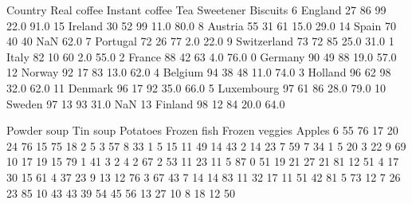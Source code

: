 \documentclass[letterpaper,10pt,english]{jupyterBook}
\begin{document}
\begin{sphinxVerbatim}[commandchars=\\\{\}]
        Country  Real coffee  Instant coffee  Tea  Sweetener  Biscuits  \PYGZbs{}
6       England           27              86   99       22.0      91.0   
15      Ireland           30              52   99       11.0      80.0   
8       Austria           55              31   61       15.0      29.0   
14        Spain           70              40   40        NaN      62.0   
7      Portugal           72              26   77        2.0      22.0   
9   Switzerland           73              72   85       25.0      31.0   
1         Italy           82              10   60        2.0      55.0   
2        France           88              42   63        4.0      76.0   
0       Germany           90              49   88       19.0      57.0   
12       Norway           92              17   83       13.0      62.0   
4       Belgium           94              38   48       11.0      74.0   
3       Holland           96              62   98       32.0      62.0   
11      Denmark           96              17   92       35.0      66.0   
5    Luxembourg           97              61   86       28.0      79.0   
10       Sweden           97              13   93       31.0       NaN   
13      Finland           98              12   84       20.0      64.0   

    Powder soup  Tin soup  Potatoes  Frozen fish  Frozen veggies  Apples  \PYGZbs{}
6            55        76        17           20              24      76   
15           75        18         2            5               3      57   
8            33         1         5           15              11      49   
14           43         2        14           23               7      59   
7            34         1         5           20               3      22   
9            69        10        17           19              15      79   
1            41         3         2            4               2      67   
2            53        11        23           11               5      87   
0            51        19        21           27              21      81   
12           51         4        17           30              15      61   
4            37        23         9           13              12      76   
3            67        43         7           14              14      83   
11           32        17        11           51              42      81   
5            73        12         7           26              23      85   
10           43        43        39           54              45      56   
13           27        10         8           18              12      50   


\end{sphinxVerbatim}
\end{document}

